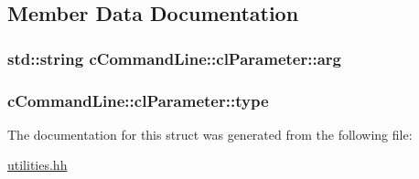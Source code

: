 \subsection{Member Data Documentation}
\subsubsection[{\texorpdfstring{arg}{arg}}]{\setlength{\rightskip}{0pt plus 5cm}std\+::string c\+Command\+Line\+::cl\+Parameter\+::arg}\hypertarget{structcCommandLine_1_1clParameter_afb1f7ab3f77c4a762e3bf342cc6b84df}{}\label{structcCommandLine_1_1clParameter_afb1f7ab3f77c4a762e3bf342cc6b84df}
\subsubsection[{\texorpdfstring{type}{type}}]{ c\+Command\+Line\+::cl\+Parameter\+::type}\hypertarget{structcCommandLine_1_1clParameter_ad9a8e723680dd3e29f74e62f940968fe}{}\label{structcCommandLine_1_1clParameter_ad9a8e723680dd3e29f74e62f940968fe}


The documentation for this struct was generated from the following file\+:\begin{DoxyCompactItemize}
\item 
\hyperlink{utilities_8hh}{utilities.\+hh}\end{DoxyCompactItemize}
